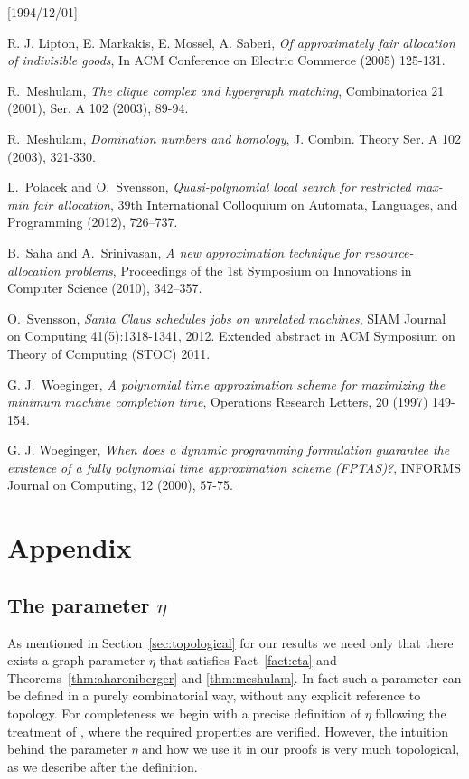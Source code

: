 \NeedsTeXFormat{LaTeX2e}[1994/12/01]\documentclass[letterpaper, 11pt]{article}
\theoremstyle{definition}
\theoremstyle{remark}
\numberwithin{equation}{section}
\begin{document}
\begin{thebibliography}{10}
R. J. Lipton, E. Markakis, E. Mossel, A. Saberi, \emph{Of approximately
  fair allocation of indivisible goods}, In ACM Conference on Electric
Commerce (2005) 125-131.

R.~Meshulam, \emph{The clique complex and hypergraph matching},
Combinatorica 21 (2001), 
Ser. A 102 (2003), 89-94.

R.~Meshulam, \emph{Domination numbers and homology}, J. Combin. Theory Ser. A 102 (2003), 321-330.

L.~Polacek and O.~Svensson, \emph{Quasi-polynomial local search for
  restricted max-min fair 
allocation}, 39th International Colloquium on Automata, Languages, and
Programming (2012), 726–737.

B.~Saha and A.~Srinivasan, \emph{A new approximation technique for
  resource-allocation problems}, 
Proceedings of the 1st Symposium on Innovations in Computer Science
(2010), 342–357.

O.~Svensson, \emph{Santa Claus schedules jobs on unrelated machines}, 
SIAM Journal on Computing 41(5):1318-1341, 2012. 
Extended abstract in ACM Symposium on Theory of Computing (STOC)
2011.

 G. J.~Woeginger, \emph{A polynomial time approximation scheme for
   maximizing the minimum machine completion time}, Operations
 Research Letters, 20 (1997) 149-154.

 G. J. Woeginger, \emph{When does a dynamic programming formulation
 guarantee the existence of a fully polynomial time approximation
 scheme (FPTAS)?}, INFORMS Journal on Computing, 12 (2000), 57-75.

\end{thebibliography}

\section{Appendix}
\subsection{The parameter $\eta$}
As mentioned in Section~\ref{sec:topological} for our results we need only that there
exists a graph parameter $\eta$ that satisfies Fact~\ref{fact:eta} and
Theorems~\ref{thm:aharoniberger} and \ref{thm:meshulam}. In fact such
a parameter can be defined in a purely combinatorial way, without any
explicit reference to topology. For completeness we begin with a
precise definition of $\eta$ following the
treatment of \cite{haxell2}, where the required properties are
verified. 
However, the intuition behind the parameter $\eta$ and how we use it
in our proofs is very much topological, as we describe after the definition. 
\end{document}
